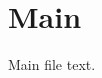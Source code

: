 \documentclass{report}
\begin{document}
\chapter{Main}\label{ch:main}
Main file text.


\end{document}
